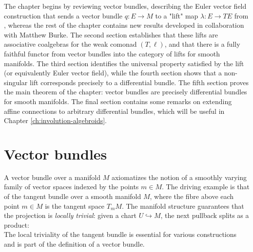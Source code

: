 The chapter begins by reviewing vector bundles, describing the Euler vector field construction that sends a vector bundle $q:E \to M$ to a "lift" map $\lambda:E \to TE$ from \cite{Grabowski2009}, whereas the rest of the chapter contains new results developed in collaboration with Matthew Burke. The second section establishes that these lifts are associative coalgebras for the weak comonad $(T,\ell)$, and that there is a fully faithful functor from vector bundles into the category of lifts for smooth manifolds. The third section identifies the universal property satisfied by the lift (or equivalently Euler vector field), while the fourth section shows that a non-singular lift corresponds precisely to a differential bundle. The fifth section proves the main theorem of the chapter: vector bundles are precisely differential bundles for smooth manifolds. The final section contains some remarks on extending affine connections to arbitrary differential bundles, which will be useful in Chapter \ref{ch:involution-algebroids}. 



\section{Vector bundles}%
\label{sec:vector-bundles}

A vector bundle over a manifold $M$ axiomatizes the notion of a smoothly varying family of vector spaces indexed by the points $m \in M$.
The driving example is that of the tangent bundle over a smooth manifold $M$, where the fibre above each point $m \in M$ is the tangent space $T_mM$.
The manifold structure guarantees that the projection is \emph{locally trivial}: given a chart $U \hookrightarrow M$, the next pullback splits as a product:
\[\]
The local triviality of the tangent bundle is essential for various constructions and is part of the definition of a vector bundle.

